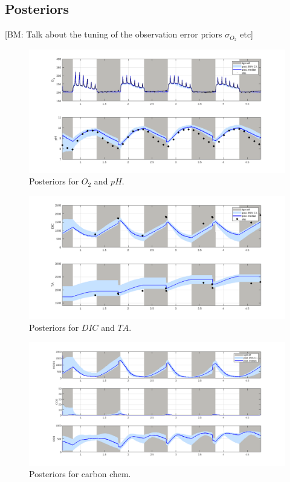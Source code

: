 \documentclass{ruthesis}
\begin{document}
\FloatBarrier
\subsection{Posteriors}

[BM: Talk about the tuning of the observation error priors $\sigma_{O_2}$ etc]


\begin{figure}
	\centerline{\includegraphics[width=1.2\textwidth]{images_microalgae/plots/O2_pH}}
	\caption[.]{Posteriors for $O_2$ and $pH$.}
	\label{fig:pos_O2_pH}
\end{figure}

\begin{figure}
	\centerline{\includegraphics[width=1.2\textwidth]{images_microalgae/plots/DIC_TA}}
	\caption[.]{Posteriors for $DIC$ and $TA$.}
	\label{fig:pos_DIC_TA}
\end{figure}

\begin{figure}
	\centerline{\includegraphics[width=1.2\textwidth]{images_microalgae/plots/carbon}}
	\caption[.]{Posteriors for carbon chem.}
	\label{fig:pos_carbon}
\end{figure}
\end{document}
